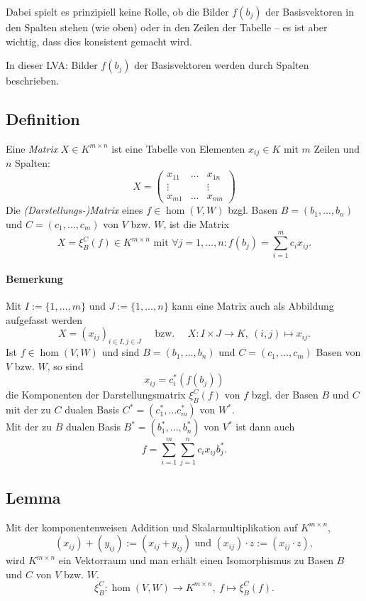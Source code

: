 	Dabei spielt es prinzipiell keine Rolle, ob die Bilder $ f(b_j) $ der Basisvektoren in den Spalten stehen (wie oben) oder in den Zeilen der Tabelle -- es ist aber wichtig, dass dies konsistent gemacht wird.
	
	In dieser LVA: Bilder $ f(b_j) $ der Basisvektoren werden durch Spalten beschrieben.

\subsection{Definition}
	\begin{Definition}[Matrix]
		Eine \emph{Matrix} $ X\in K^{m\times n} $ ist eine Tabelle von Elementen $ x_{ij}\in K $ mit $ m $ Zeilen und $ n $ Spalten:
			\[ X = \begin{pmatrix}
			x_{11} 		& \dots 	& x_{1n}\\
			\vdots 		& 			& \vdots\\
			x_{m1} 		& \dots		& x_{mn}
			\end{pmatrix} \]
		Die \emph{(Darstellungs-)Matrix} eines $ f\in \hom(V,W) $ bzgl. Basen $ B= (b_1,\dots,b_n) $ und $ C=(c_1,\dots,c_m) $ von $ V $ bzw. $ W $, ist die Matrix
			\[ X = \xi^C_B(f)\in K^{m\times n}\text{ mit }\forall j=1,\dots,n:f(b_j) = \sum_{i=1}^{m}c_ix_{ij}. \]
	\end{Definition}
	
\paragraph{Bemerkung}
	Mit $ I:= \{1,\dots,m\} $ und $ J:= \{1,\dots,n\} $ kann eine Matrix auch als Abbildung aufgefasst werden
		\[ X = (x_{ij})_{i\in I,j\in J} \quad\text{ bzw. }\quad X:I\times J\to K,\ (i,j)\mapsto x_{ij}. \]
	Ist $ f\in \hom(V,W) $ und sind $ B=(b_1,\dots,b_n) $ und $ C=(c_1,\dots,c_m) $ Basen von $ V $ bzw. $ W $, so sind
		\[ x_{ij} = c_i^*(f(b_j)) \]
	die Komponenten der Darstellungsmatrix $ \xi_B^C(f) $ von $ f $ bzgl. der Basen $ B $ und $ C $ mit der zu $ C $ dualen Basis $ C^*=(c_1^*,\dots c_m^*) $ von $ W^* $.\\
	Mit der zu $ B $ dualen Basis $ B^*= (b_1^*,\dots,b_n^*) $ von $ V^* $ ist dann auch
		\[ f=\sum_{i=1}^{m}\sum_{j=1}^{n} c_ix_{ij}b_j^*. \]
\subsection{Lemma}
	\begin{Lemma}
	Mit der komponentenweisen Addition und Skalarmultiplikation auf $ K^{m\times n} $,
		\[ (x_{ij})+(y_{ij}) := (x_{ij}+y_{ij}) \text{ und } (x_{ij})\cdot z := (x_{ij}\cdot z), \]
	wird $ K^{m\times n} $ ein Vektorraum und man erhält einen Isomorphismus zu Basen $B$ und $C$ von $V$ bzw. $W$.
		\[ \xi_B^C:\hom(V,W)\to K^{m\times n},\ f\mapsto \xi_B^C(f). \]
	\end{Lemma}
